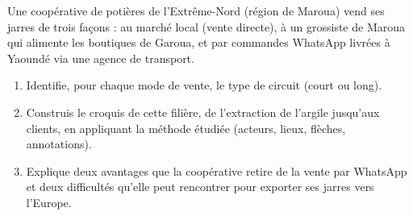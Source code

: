 \documentclass[11pt]{article}
\begin{document}
\begin{exercice}
Une coopérative de potières de l'Extrême-Nord (région de Maroua) vend ses jarres de trois façons : au marché local (vente directe), à un grossiste de Maroua qui alimente les boutiques de Garoua, et par commandes WhatsApp livrées à Yaoundé via une agence de transport.
\begin{enumerate}
\item Identifie, pour chaque mode de vente, le type de circuit (court ou long).
\item Construis le croquis de cette filière, de l'extraction de l'argile jusqu'aux clients, en appliquant la méthode étudiée (acteurs, lieux, flèches, annotations).
\item Explique deux avantages que la coopérative retire de la vente par WhatsApp et deux difficultés qu'elle peut rencontrer pour exporter ses jarres vers l'Europe.
\end{enumerate}
\end{exercice}
\end{document}
